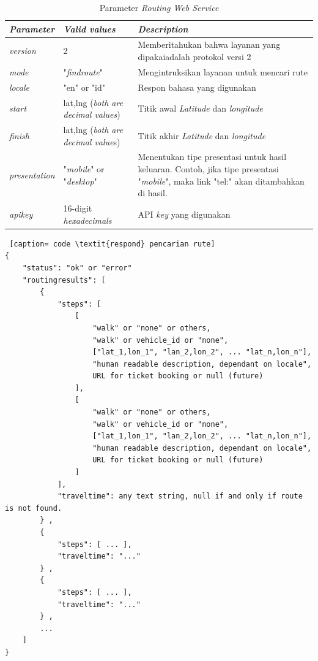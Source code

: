 \begin{table}[h]
\begin{tabular}{ |p{3cm}|p{3cm}|p{8cm}| }
	\hline
	\textit{Parameter} & \textit{Valid values} & \textit{Description} \\ \hline \hline
  \textit{version} & 2 & Memberitahukan bahwa layanan yang dipakaiadalah protokol versi 2 \\ \hline
  \textit{mode} & "\textit{findroute}" & Mengintruksikan layanan untuk mencari rute \\ \hline
  \textit{locale} & "en" or "id" & Respon bahasa yang digunakan \\ \hline
	\textit{start} & lat,lng (\textit{both are decimal values}) & Titik awal \textit{Latitude} dan \textit{longitude} \\ \hline
  \textit{finish} & lat,lng (\textit{both are decimal value}s) & Titik akhir \textit{Latitude} dan \textit{longitude}  \\ \hline
  \textit{presentation} & "\textit{mobile}" or "\textit{desktop}" & Menentukan tipe presentasi untuk hasil keluaran. Contoh, jika tipe presentasi "\textit{mobile}",  maka link "tel:" akan ditambahkan di hasil. \\ \hline
	\textit{apikey} & 16-digit \textit{hexadecimals} & API \textit{key} yang digunakan \\ \hline
\end{tabular}
	\caption{Parameter \textit{Routing Web Service}}
	\label{tab:TabelParameterRoutingWebService}
	\end{table}
	
\begin{lstlisting} [caption= code \textit{respond} pencarian rute]
{ 
    "status": "ok" or "error" 
    "routingresults": [ 
        {
            "steps": [
                [
                    "walk" or "none" or others,
                    "walk" or vehicle_id or "none",
                    ["lat_1,lon_1", "lan_2,lon_2", ... "lat_n,lon_n"],
                    "human readable description, dependant on locale",
                    URL for ticket booking or null (future)
                ],
                [
                    "walk" or "none" or others,
                    "walk" or vehicle_id or "none",
                    ["lat_1,lon_1", "lan_2,lon_2", ... "lat_n,lon_n"],
                    "human readable description, dependant on locale",
                    URL for ticket booking or null (future)
                ]
            ],
            "traveltime": any text string, null if and only if route is not found.
        } ,
        {
            "steps": [ ... ],
            "traveltime": "..."
        } ,
        {
            "steps": [ ... ],
            "traveltime": "..."
        } ,
        ...     
    ]
}
\end{lstlisting}

